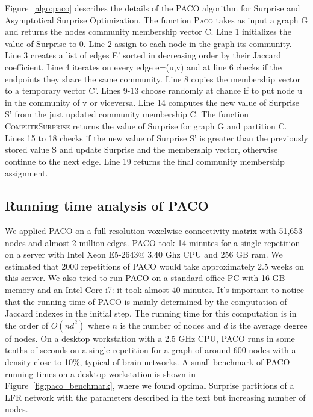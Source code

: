 Figure~\ref{algo:paco} describes the details of the PACO algorithm for Surprise and Asymptotical Surprise Optimization.
The function \textsc{Paco} takes as input a graph G and returns the nodes community membership vector C. Line 1 initializes the value of Surprise to 0. Line 2 assign to each node in the graph its community. Line 3 creates a list of edges E' sorted in decreasing order by their Jaccard coefficient. Line 4 iterates on every edge e=(u,v) and at line 6 checks if the endpoints they share the same community. Line 8 copies the membership vector to a temporary vector C'. Lines 9-13 choose randomly at chance if to put node u in the community of v or viceversa. Line 14 computes the new value of Surprise S' from the just updated community membership C. The function \textsc{ComputeSurprise} returns the value of Surprise for graph G and partition C. Lines 15 to 18 checks if the new value of Surprise S' is greater than the previously stored value S and update Surprise and the membership vector, otherwise continue to the next edge. Line 19 returns the final community membership assignment.



\subsection{Running time analysis of PACO}
We applied PACO on a full-resolution voxelwise connectivity matrix with 51,653 nodes and almost 2 million edges. PACO took 14 minutes for a single repetition on a server with Intel Xeon E5-2643@ 3.40 Ghz CPU and 256 GB ram.
We estimated that 2000 repetitions of PACO would take approximately 2.5 weeks on this server. We also tried to run PACO on a standard office PC with 16 GB memory and an Intel Core i7: it took almost 40 minutes. It’s important to notice that the running time of PACO is mainly determined by the computation of Jaccard indexes in the initial step.
The running time for this computation is in the order of $O(nd^2)$ where $n$ is the number of nodes and $d$ is the average degree of nodes. On a desktop workstation with a 2.5 GHz CPU, PACO runs in some tenths of seconds on a single repetition for a graph of around 600 nodes with a density close to 10\%, typical of brain networks. A small benchmark of PACO running times on a desktop workstation is shown in Figure~\ref{fig:paco_benchmark}, where we found optimal Surprise partitions of a LFR network with the parameters described in the text but increasing number of nodes.

